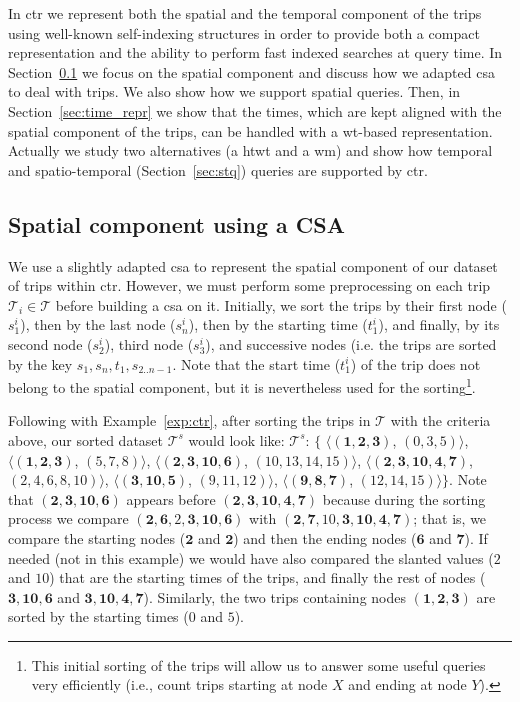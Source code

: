 	In \gls{ctr} we represent both the spatial and the temporal component of the trips using well-known
	self-indexing structures in order to provide both a compact representation and the ability to 
	perform fast indexed searches at query time. In Section~\ref{sec:transnet_repr} we focus on the
	spatial component and discuss how we adapted  \gls{csa} to deal with trips. We also
	show how we support spatial queries. Then, in Section~\ref{sec:time_repr} we show that the times,
	which are kept aligned with the spatial component of the trips, can be handled with   
	a \gls{wt}-based representation. Actually we study two alternatives (a \gls{htwt} and a \gls{wm}) 
	and show how temporal and spatio-temporal (Section~\ref{sec:stq}) queries are supported by \gls{ctr}.

	\subsection{Spatial component using a CSA}
	\label{sec:transnet_repr}
	We use a slightly adapted \gls{csa} to represent the spatial component of our dataset of trips within \gls{ctr}. 
	However, we must perform some preprocessing on each trip  $\mathcal{T}_i \in \mathcal{T}$ before building a \gls{csa} on it. Initially, we sort the trips by their first node ($s^i_1$), then by the last node ($s^i_n$), then by the starting time ($t^i_1$), and finally, by its second node ($s^i_2$), third node ($s^i_3$), and successive nodes (i.e. the trips are sorted by the key $s_1,s_n,t_1,s_{2..n-1}$.  Note that the start time ($t^i_1$) of the trip does not belong to the spatial component, but it is nevertheless used for the sorting\footnote{This initial sorting of the trips will allow us to answer some useful queries very efficiently  (i.e., count trips starting at node $X$ and ending at node $Y$).}.

	Following with Example~\ref{exp:ctr}, after sorting the trips in $\mathcal{T}$ with the criteria above, 
	our sorted dataset $\mathcal{T}^s$ would look like: 
	$\mathcal{T}^s$: $\{$%
	$\langle (\mathbf{1,2,3     })$, $(\mathit{0,3,5})                     \rangle$, 
	$\langle (\mathbf{1,2,3     })$, $(\mathit{5,7,8})                     \rangle$, 
	$\langle (\mathbf{2,3,10,6  })$, $(\mathit{10,13,14,15})           \rangle$, 
	$\langle (\mathbf{2,3,10,4,7})$, $(\mathit{2,4,6,8,10}) \rangle$, 
	$\langle (\mathbf{3,10,5    })$, $(\mathit{9,11,12})                     \rangle$, 
	$\langle (\mathbf{9,8,7     })$, $(\mathit{12,14,15})                    \rangle$$\}$. 
	Note that  $ (\mathbf{2,3,10,6  })$ appears before $(\mathbf{2,3,10,4,7})$ because
	during the sorting process we compare $ (\mathbf{2,6,\mathit{2},3, 10,6  })$ with $ (\mathbf{2,7,\mathit{10},3, 10,4,7})$;
	that is, we compare the starting nodes ($\mathbf{2}$ and $\mathbf{2}$) and then the ending nodes ($\mathbf{6}$ and $\mathbf{7}$).
	If needed  (not in this example) we would have also compared the slanted values ($\mathit{2}$ and $\mathit{10}$) 
	that are the starting times of the trips, and finally the rest of nodes  ($ \mathbf{3, 10,6  }$ and $ \mathbf{3, 10,4,7}$).
	Similarly, the two trips containing nodes $ (\mathbf{1,2,3})$ are sorted by the starting times ($\mathit{0}$ and $\mathit{5}$).


